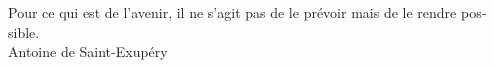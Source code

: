 \begin{center}
\vspace*{\fill}
{\selectfont \foreignlanguage{french} { Pour ce qui est de l'avenir, il ne s'agit pas de le prévoir mais de le rendre possible. }}
\\
{\selectfont \foreignlanguage{french} { Antoine de Saint-Exupéry }}
\vspace*{\fill}
\end{center}










